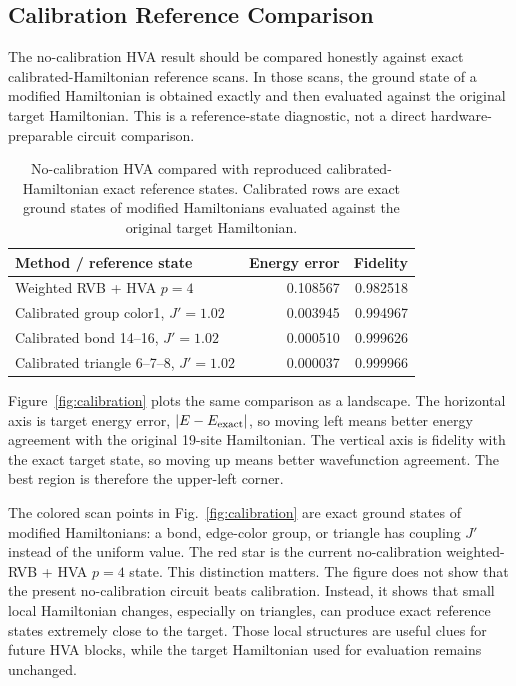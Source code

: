 \documentclass[11pt]{article}
\begin{document}
\subsection{Calibration Reference Comparison}

The no-calibration HVA result should be compared honestly against exact calibrated-Hamiltonian reference scans.  In those scans, the ground state of a modified Hamiltonian is obtained exactly and then evaluated against the original target Hamiltonian.  This is a reference-state diagnostic, not a direct hardware-preparable circuit comparison.

\begin{table}[H]
\centering
\caption{No-calibration HVA compared with reproduced calibrated-Hamiltonian exact reference states.  Calibrated rows are exact ground states of modified Hamiltonians evaluated against the original target Hamiltonian.}
\label{tab:calibration}
\begin{tabular}{lrr}
\toprule
Method / reference state & Energy error & Fidelity \\
\midrule
Weighted RVB + HVA $p=4$ & 0.108567 & 0.982518 \\
Calibrated group color1, $J'=1.02$ & 0.003945 & 0.994967 \\
Calibrated bond 14--16, $J'=1.02$ & 0.000510 & 0.999626 \\
Calibrated triangle 6--7--8, $J'=1.02$ & 0.000037 & 0.999966 \\
\bottomrule
\end{tabular}
\end{table}

Figure~\ref{fig:calibration} plots the same comparison as a landscape.  The horizontal axis is target energy error, $|E-E_{\rm exact}|$, so moving left means better energy agreement with the original 19-site Hamiltonian.  The vertical axis is fidelity with the exact target state, so moving up means better wavefunction agreement.  The best region is therefore the upper-left corner.

The colored scan points in Fig.~\ref{fig:calibration} are exact ground states of modified Hamiltonians: a bond, edge-color group, or triangle has coupling $J'$ instead of the uniform value.  The red star is the current no-calibration weighted-RVB + HVA $p=4$ state.  This distinction matters.  The figure does not show that the present no-calibration circuit beats calibration.  Instead, it shows that small local Hamiltonian changes, especially on triangles, can produce exact reference states extremely close to the target.  Those local structures are useful clues for future HVA blocks, while the target Hamiltonian used for evaluation remains unchanged.
\end{document}
